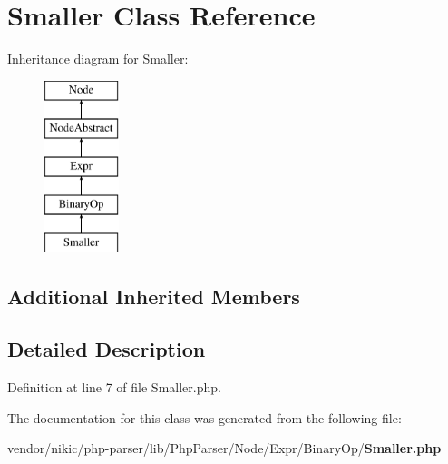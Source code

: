 \section{Smaller Class Reference}
\label{class_php_parser_1_1_node_1_1_expr_1_1_binary_op_1_1_smaller}
Inheritance diagram for Smaller\+:\begin{figure}[H]
\begin{center}
\leavevmode
\includegraphics[height=5.000000cm]{class_php_parser_1_1_node_1_1_expr_1_1_binary_op_1_1_smaller}
\end{center}
\end{figure}
\subsection*{Additional Inherited Members}


\subsection{Detailed Description}


Definition at line 7 of file Smaller.\+php.



The documentation for this class was generated from the following file\+:\begin{DoxyCompactItemize}
\item 
vendor/nikic/php-\/parser/lib/\+Php\+Parser/\+Node/\+Expr/\+Binary\+Op/{\bf Smaller.\+php}\end{DoxyCompactItemize}
